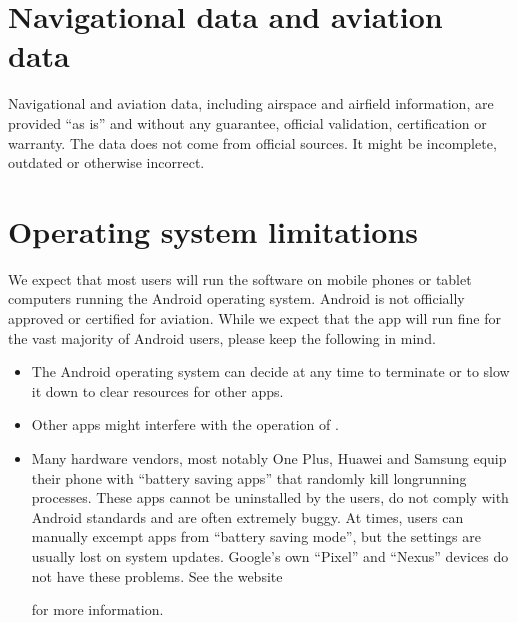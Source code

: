 \documentclass[letterpaper,10pt,english]{sphinxmanual}
\begin{document}
\section{Navigational data and aviation data}
\label{\detokenize{01-intro/01-think:navigational-data-and-aviation-data}}
\sphinxAtStartPar
Navigational\textendash{} and aviation data, including airspace and airfield information,
are provided “as is” and without any guarantee, official validation,
certification or warranty.  The data does not come from official sources.  It
might be incomplete, outdated or otherwise incorrect.


\section{Operating system limitations}
\label{\detokenize{01-intro/01-think:operating-system-limitations}}
\sphinxAtStartPar
We expect that most users will run the software on mobile phones or tablet
computers running the Android operating system.  Android is not officially
approved or certified for aviation.  While we expect that the app will run fine
for the vast majority of Android users, please keep the following in mind.
\begin{itemize}
\item {} 
\sphinxAtStartPar
The Android operating system can decide at any time to terminate  or to slow it down to clear resources for other apps.

\item {} 
\sphinxAtStartPar
Other apps might interfere with the operation of .

\item {} 
\sphinxAtStartPar
Many hardware vendors, most notably One Plus, Huawei and Samsung equip their
phone with “battery saving apps” that randomly kill long\sphinxhyphen{}running processes.
These apps cannot be uninstalled by the users, do not comply with Android
standards and are often extremely buggy.  At times, users can manually excempt
apps from “battery saving mode”, but the settings are usually lost on system
updates.  Google’s own “Pixel” and “Nexus” devices do not have these problems.
See the website %
\begin{footnote}[4]\sphinxAtStartFootnote
{}
%
\end{footnote} for more
information.

\end{itemize}
\end{document}
